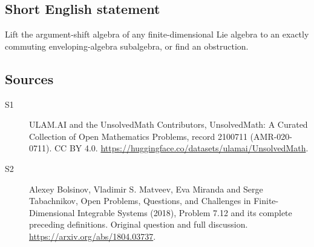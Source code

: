 \documentclass[11pt]{article}
\begin{document}
\subsection{Short English statement}
Lift the argument-shift algebra of any finite-dimensional Lie algebra to an exactly commuting enveloping-algebra subalgebra, or find an obstruction.
\subsection{Sources}
\begin{description}
\item[\hypertarget{source:2100711:1}{S1}] ULAM.AI and the UnsolvedMath Contributors, UnsolvedMath: A Curated Collection of Open Mathematics Problems, record 2100711 (AMR-020-0711). CC BY 4.0. \url{https://huggingface.co/datasets/ulamai/UnsolvedMath}.
\item[\hypertarget{source:2100711:2}{S2}] Alexey Bolsinov, Vladimir S. Matveev, Eva Miranda and Serge Tabachnikov, Open Problems, Questions, and Challenges in Finite-Dimensional Integrable Systems (2018), Problem 7.12 and its complete preceding definitions. Original question and full discussion. \url{https://arxiv.org/abs/1804.03737}.

\end{description}
\label{end:2100711}
\end{document}
